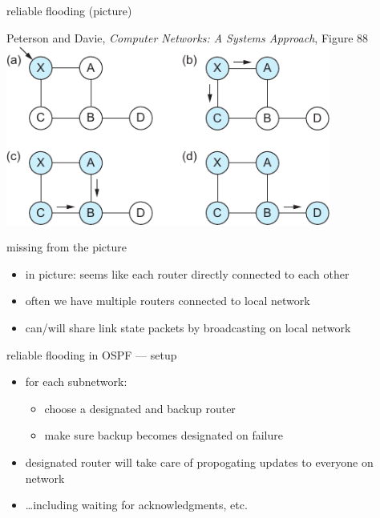
\begin{frame}{reliable flooding (picture)}

{\small Peterson and Davie, \textit{Computer Networks: A Systems Approach}, Figure 88}
\includegraphics[width=0.8\textwidth]{../routing/sysapproach-fig88}
\end{frame}

\begin{frame}{missing from the picture}
    \begin{itemize}
    \item in picture: seems like each router directly connected to each other
    \item often we have multiple routers connected to local network
    \item can/will share link state packets by broadcasting on local network
    \end{itemize}
\end{frame}

\begin{frame}{reliable flooding in OSPF --- setup}
    \begin{itemize}
    \item for each subnetwork:
        \begin{itemize}
        \item choose a designated and backup router
        \item make sure backup becomes designated on failure
        \end{itemize}
    \item designated router will take care of propogating updates to everyone on network
    \item \ldots including waiting for acknowledgments, etc.
    \end{itemize}
\end{frame}

